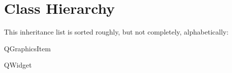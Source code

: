 \section{Class Hierarchy}
This inheritance list is sorted roughly, but not completely, alphabetically\+:\begin{DoxyCompactList}
\item Q\+Graphics\+Item\begin{DoxyCompactList}
\item {}
\item {}
\end{DoxyCompactList}
\item {}
\item Q\+Widget\begin{DoxyCompactList}
\item {}
\end{DoxyCompactList}
\item {}
\begin{DoxyCompactList}
\item {}
\end{DoxyCompactList}
\end{DoxyCompactList}
